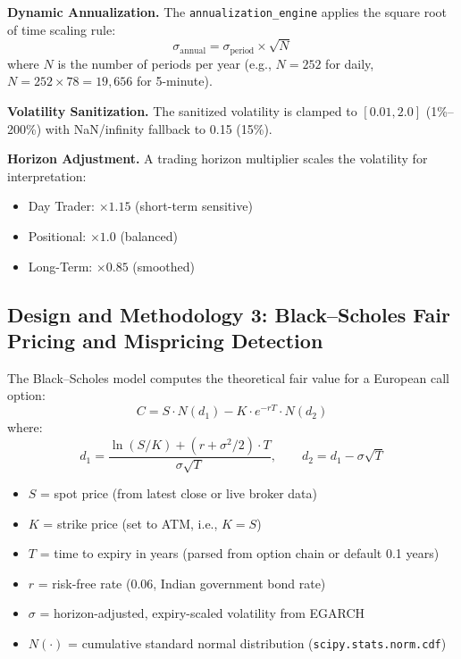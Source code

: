 \documentclass[12pt,a4paper]{article}
\begin{document}
\textbf{Dynamic Annualization.} The \texttt{annualization\_engine} applies the square root of time scaling rule:
\begin{equation}
    \sigma_\text{annual} = \sigma_\text{period} \times \sqrt{N}
\end{equation}
where $N$ is the number of periods per year (e.g., $N = 252$ for daily, $N = 252 \times 78 = 19{,}656$ for 5-minute).

\textbf{Volatility Sanitization.} The sanitized volatility is clamped to $[0.01, 2.0]$ (1\%--200\%) with NaN/infinity fallback to 0.15 (15\%).

\textbf{Horizon Adjustment.} A trading horizon multiplier scales the volatility for interpretation:
\begin{itemize}
    \item Day Trader: $\times 1.15$ (short-term sensitive)
    \item Positional: $\times 1.0$ (balanced)
    \item Long-Term: $\times 0.85$ (smoothed)
\end{itemize}

\subsection{Design and Methodology 3: Black--Scholes Fair Pricing and Mispricing Detection}

The Black--Scholes model computes the theoretical fair value for a European call option:
\begin{equation}
    C = S \cdot N(d_1) - K \cdot e^{-rT} \cdot N(d_2)
\end{equation}
where:
\begin{equation}
    d_1 = \frac{\ln(S/K) + (r + \sigma^2/2) \cdot T}{\sigma\sqrt{T}}, \qquad d_2 = d_1 - \sigma\sqrt{T}
\end{equation}

\begin{itemize}
    \item $S$ = spot price (from latest close or live broker data)
    \item $K$ = strike price (set to ATM, i.e., $K = S$)
    \item $T$ = time to expiry in years (parsed from option chain or default 0.1 years)
    \item $r$ = risk-free rate (0.06, Indian government bond rate)
    \item $\sigma$ = horizon-adjusted, expiry-scaled volatility from EGARCH
    \item $N(\cdot)$ = cumulative standard normal distribution (\texttt{scipy.stats.norm.cdf})
\end{itemize}
\end{document}
